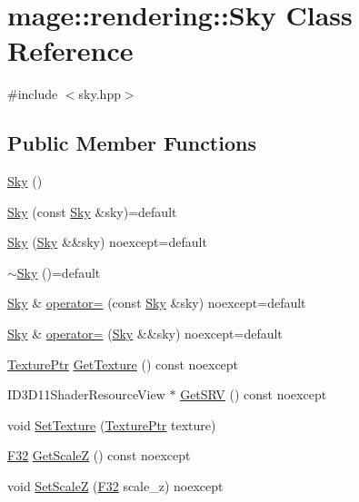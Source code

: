 \hypertarget{classmage_1_1rendering_1_1_sky}{}\section{mage\+:\+:rendering\+:\+:Sky Class Reference}
\label{classmage_1_1rendering_1_1_sky}


{\ttfamily \#include $<$sky.\+hpp$>$}

\subsection*{Public Member Functions}
\begin{DoxyCompactItemize}
\item 
\hyperlink{classmage_1_1rendering_1_1_sky_a9679ec331c5e0fc01c49760f6e74664d}{Sky} ()
\item 
\hyperlink{classmage_1_1rendering_1_1_sky_aeafa720fff92be3f02d484a47443b973}{Sky} (const \hyperlink{classmage_1_1rendering_1_1_sky}{Sky} \&sky)=default
\item 
\hyperlink{classmage_1_1rendering_1_1_sky_aa1484300b69e97812d73e0f5281d8bbc}{Sky} (\hyperlink{classmage_1_1rendering_1_1_sky}{Sky} \&\&sky) noexcept=default
\item 
\hyperlink{classmage_1_1rendering_1_1_sky_a948ac13394c361864f1da3dc27ab3326}{$\sim$\+Sky} ()=default
\item 
\hyperlink{classmage_1_1rendering_1_1_sky}{Sky} \& \hyperlink{classmage_1_1rendering_1_1_sky_a9654c598bd30fee1b0892b0abf7b7c96}{operator=} (const \hyperlink{classmage_1_1rendering_1_1_sky}{Sky} \&sky) noexcept=default
\item 
\hyperlink{classmage_1_1rendering_1_1_sky}{Sky} \& \hyperlink{classmage_1_1rendering_1_1_sky_a01b1145f77fdab81e7dce93f6a524b45}{operator=} (\hyperlink{classmage_1_1rendering_1_1_sky}{Sky} \&\&sky) noexcept=default
\item 
\hyperlink{namespacemage_1_1rendering_a6f3ae54f825328465b0cdde0f0de4a36}{Texture\+Ptr} \hyperlink{classmage_1_1rendering_1_1_sky_a575698f7fafad47d544f88bf4e2eea5e}{Get\+Texture} () const noexcept
\item 
I\+D3\+D11\+Shader\+Resource\+View $\ast$ \hyperlink{classmage_1_1rendering_1_1_sky_a8ded7262b242de3e76e4bdcd5a91f4c3}{Get\+S\+RV} () const noexcept
\item 
void \hyperlink{classmage_1_1rendering_1_1_sky_aca571c68ad345801051fcc36e32013e6}{Set\+Texture} (\hyperlink{namespacemage_1_1rendering_a6f3ae54f825328465b0cdde0f0de4a36}{Texture\+Ptr} texture)
\item 
\hyperlink{namespacemage_aa97e833b45f06d60a0a9c4fc22ae02c0}{F32} \hyperlink{classmage_1_1rendering_1_1_sky_a12023dbc7f9511152719cee35a84fc34}{Get\+ScaleZ} () const noexcept
\item 
void \hyperlink{classmage_1_1rendering_1_1_sky_a92fcaf3c89a39fd97a37ab61adf1c194}{Set\+ScaleZ} (\hyperlink{namespacemage_aa97e833b45f06d60a0a9c4fc22ae02c0}{F32} scale\+\_\+z) noexcept
\end{DoxyCompactItemize}
